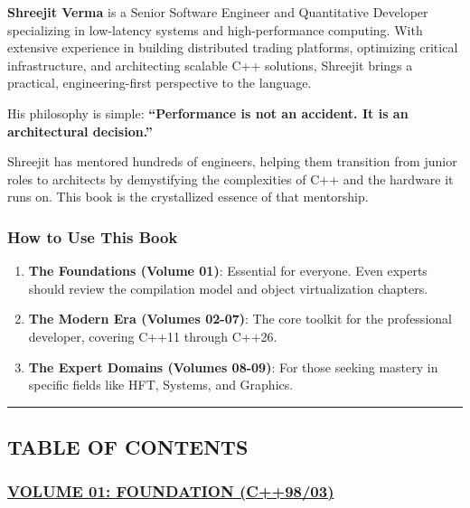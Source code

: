 \textbf{Shreejit Verma} is a Senior Software Engineer and Quantitative
Developer specializing in low-latency systems and high-performance
computing. With extensive experience in building distributed trading
platforms, optimizing critical infrastructure, and architecting scalable
C++ solutions, Shreejit brings a practical, engineering-first
perspective to the language.

His philosophy is simple: \textbf{``Performance is not an accident. It
is an architectural decision.''}

Shreejit has mentored hundreds of engineers, helping them transition
from junior roles to architects by demystifying the complexities of C++
and the hardware it runs on. This book is the crystallized essence of
that mentorship.

\hypertarget{how-to-use-this-book}{%
\subsubsection{How to Use This Book}\label{how-to-use-this-book}}

\begin{enumerate}
\def\labelenumi{\arabic{enumi}.}
\tightlist
\item
  \textbf{The Foundations (Volume 01)}: Essential for everyone. Even
  experts should review the compilation model and object virtualization
  chapters.
\item
  \textbf{The Modern Era (Volumes 02-07)}: The core toolkit for the
  professional developer, covering C++11 through C++26.
\item
  \textbf{The Expert Domains (Volumes 08-09)}: For those seeking mastery
  in specific fields like HFT, Systems, and Graphics.
\end{enumerate}

\begin{center}\rule{0.5\linewidth}{0.5pt}\end{center}

\hypertarget{table-of-contents}{%
\subsection{TABLE OF CONTENTS}\label{table-of-contents}}

\hypertarget{volume-01-foundation-c9803}{%
\subsubsection{\texorpdfstring{\protect\hyperlink{volume-01-foundation-c98-03}{VOLUME
01: FOUNDATION
(C++98/03)}}{VOLUME 01: FOUNDATION (C++98/03)}}\label{volume-01-foundation-c9803}}

